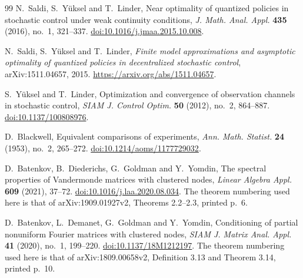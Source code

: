 \begin{thebibliography}{99}
N.~Saldi, S.~Y\"uksel and T.~Linder, Near optimality of quantized policies
in stochastic control under weak continuity conditions,
\emph{J. Math. Anal. Appl.} \textbf{435} (2016), no.~1, 321--337.
\href{https://doi.org/10.1016/j.jmaa.2015.10.008}{doi:10.1016/j.jmaa.2015.10.008}.

N.~Saldi, S.~Y\"uksel and T.~Linder, \emph{Finite model approximations
and asymptotic optimality of quantized policies in decentralized
stochastic control}, arXiv:1511.04657, 2015.
\url{https://arxiv.org/abs/1511.04657}.

S.~Y\"uksel and T.~Linder, Optimization and convergence of observation
channels in stochastic control, \emph{SIAM J. Control Optim.}
\textbf{50} (2012), no.~2, 864--887.
\href{https://doi.org/10.1137/100808976}{doi:10.1137/100808976}.

D.~Blackwell, Equivalent comparisons of experiments,
\emph{Ann. Math. Statist.} \textbf{24} (1953), no.~2, 265--272.
\href{https://doi.org/10.1214/aoms/1177729032}{doi:10.1214/aoms/1177729032}.

D.~Batenkov, B.~Diederichs, G.~Goldman and Y.~Yomdin,
The spectral properties of Vandermonde matrices with clustered nodes,
\emph{Linear Algebra Appl.} \textbf{609} (2021), 37--72.
\href{https://doi.org/10.1016/j.laa.2020.08.034}{doi:10.1016/j.laa.2020.08.034}.
The theorem numbering used here is that of arXiv:1909.01927v2,
Theorems 2.2--2.3, printed p.~6.

D.~Batenkov, L.~Demanet, G.~Goldman and Y.~Yomdin,
Conditioning of partial nonuniform Fourier matrices with clustered nodes,
\emph{SIAM J. Matrix Anal. Appl.} \textbf{41} (2020), no.~1, 199--220.
\href{https://doi.org/10.1137/18M1212197}{doi:10.1137/18M1212197}.
The theorem numbering used here is that of arXiv:1809.00658v2,
Definition 3.13 and Theorem 3.14, printed p.~10.
\end{thebibliography}
